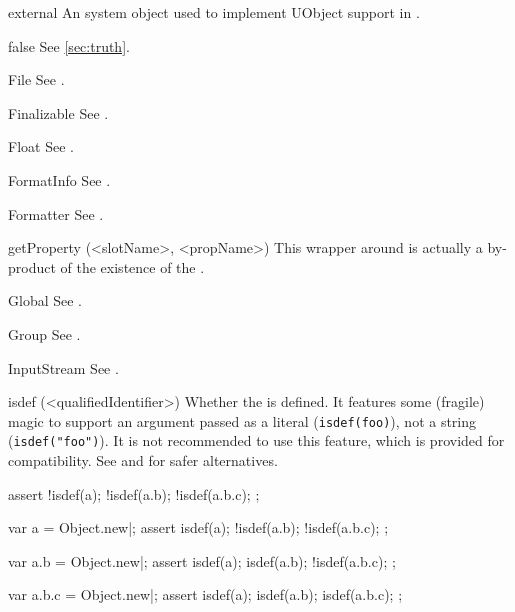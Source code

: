 \begin{urbiscriptapi}
\item[external] An system object used to implement UObject support in
  \us.


\item[false]  See \autoref{sec:truth}.


\item[File] See .


\item[Finalizable] See .


\item[Float] See .


\item[FormatInfo] See .


\item[Formatter] See .


\item[getProperty](<slotName>, <propName>)%
  This wrapper around  is actually a by-product
  of the existence of the  .


\item[Global] See .


\item[Group] See .


\item[InputStream] See .


\item[isdef](<qualifiedIdentifier>)%
  Whether the  is defined.  It features some
  (fragile) magic to support an argument passed as a literal
  (\lstinline|isdef(foo)|), not a string (\lstinline|isdef("foo")|).  It is
  not recommended to use this feature, which is provided for \us
  compatibility.  See  and
   for safer alternatives.
\begin{urbiscript}
assert
{
  !isdef(a);
  !isdef(a.b);
  !isdef(a.b.c);
};

var a = Object.new|;
assert
{
   isdef(a);
  !isdef(a.b);
  !isdef(a.b.c);
};

var a.b = Object.new|;
assert
{
   isdef(a);
   isdef(a.b);
  !isdef(a.b.c);
};

var a.b.c = Object.new|;
assert
{
   isdef(a);
   isdef(a.b);
   isdef(a.b.c);
};
\end{urbiscript}



\end{urbiscriptapi}
